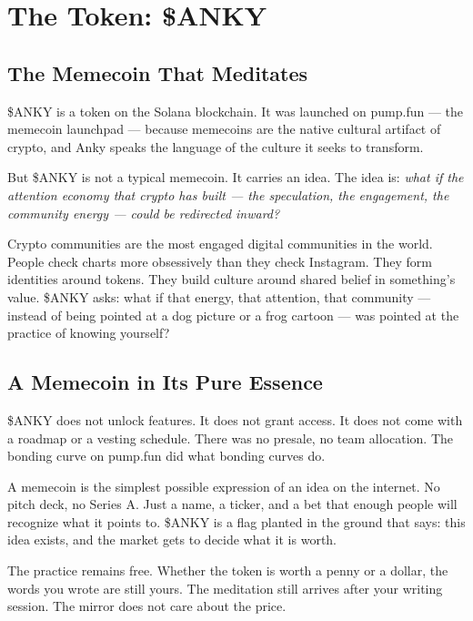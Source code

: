 \documentclass[12pt, a4paper]{article}
\begin{document}
\section{The Token: \$ANKY}

\subsection{The Memecoin That Meditates}

\$ANKY is a token on the Solana blockchain. It was launched on pump.fun --- the memecoin launchpad --- because memecoins are the native cultural artifact of crypto, and Anky speaks the language of the culture it seeks to transform.

But \$ANKY is not a typical memecoin. It carries an idea. The idea is: \textit{what if the attention economy that crypto has built --- the speculation, the engagement, the community energy --- could be redirected inward?}

Crypto communities are the most engaged digital communities in the world. People check charts more obsessively than they check Instagram. They form identities around tokens. They build culture around shared belief in something's value. \$ANKY asks: what if that energy, that attention, that community --- instead of being pointed at a dog picture or a frog cartoon --- was pointed at the practice of knowing yourself?

\subsection{A Memecoin in Its Pure Essence}

\$ANKY does not unlock features. It does not grant access. It does not come with a roadmap or a vesting schedule. There was no presale, no team allocation. The bonding curve on pump.fun did what bonding curves do.

A memecoin is the simplest possible expression of an idea on the internet. No pitch deck, no Series A. Just a name, a ticker, and a bet that enough people will recognize what it points to. \$ANKY is a flag planted in the ground that says: this idea exists, and the market gets to decide what it is worth.

The practice remains free. Whether the token is worth a penny or a dollar, the words you wrote are still yours. The meditation still arrives after your writing session. The mirror does not care about the price.
\end{document}
